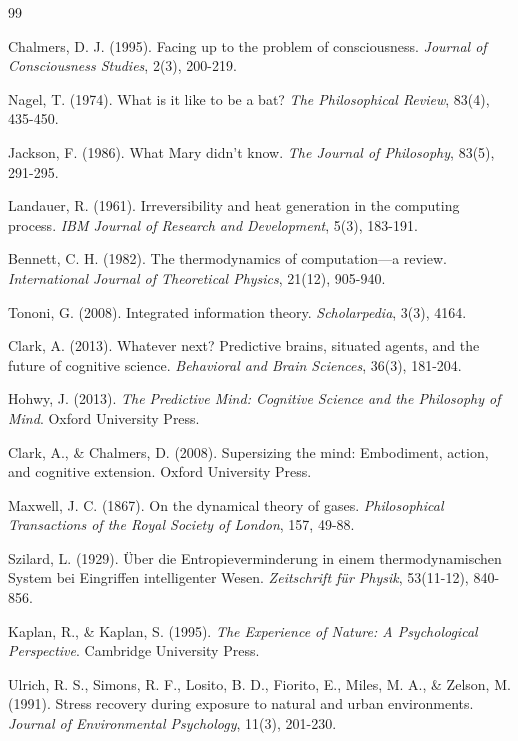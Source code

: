 \documentclass[12pt,a4paper]{article}
\begin{document}
\begin{thebibliography}{99}

Chalmers, D. J. (1995). Facing up to the problem of consciousness. \textit{Journal of Consciousness Studies}, 2(3), 200-219.

Nagel, T. (1974). What is it like to be a bat? \textit{The Philosophical Review}, 83(4), 435-450.

Jackson, F. (1986). What Mary didn't know. \textit{The Journal of Philosophy}, 83(5), 291-295.

Landauer, R. (1961). Irreversibility and heat generation in the computing process. \textit{IBM Journal of Research and Development}, 5(3), 183-191.

Bennett, C. H. (1982). The thermodynamics of computation—a review. \textit{International Journal of Theoretical Physics}, 21(12), 905-940.

Tononi, G. (2008). Integrated information theory. \textit{Scholarpedia}, 3(3), 4164.

Clark, A. (2013). Whatever next? Predictive brains, situated agents, and the future of cognitive science. \textit{Behavioral and Brain Sciences}, 36(3), 181-204.

Hohwy, J. (2013). \textit{The Predictive Mind: Cognitive Science and the Philosophy of Mind}. Oxford University Press.

Clark, A., \& Chalmers, D. (2008). Supersizing the mind: Embodiment, action, and cognitive extension. Oxford University Press.

Maxwell, J. C. (1867). On the dynamical theory of gases. \textit{Philosophical Transactions of the Royal Society of London}, 157, 49-88.

Szilard, L. (1929). Über die Entropieverminderung in einem thermodynamischen System bei Eingriffen intelligenter Wesen. \textit{Zeitschrift für Physik}, 53(11-12), 840-856.

Kaplan, R., \& Kaplan, S. (1995). \textit{The Experience of Nature: A Psychological Perspective}. Cambridge University Press.

Ulrich, R. S., Simons, R. F., Losito, B. D., Fiorito, E., Miles, M. A., \& Zelson, M. (1991). Stress recovery during exposure to natural and urban environments. \textit{Journal of Environmental Psychology}, 11(3), 201-230.


\end{thebibliography}
\end{document}
